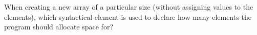 When creating a new array of a particular size (without assigning values to the elements), which syntactical element is used to declare how many elements the program should allocate space for?
